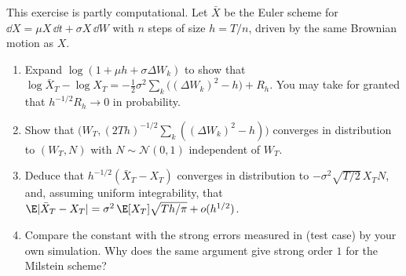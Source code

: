 \begin{exercise}\label{ex:ps-strong-constant}
\hard This exercise is partly computational. Let $\bar X$ be the Euler scheme for
$\dd X=\mu X\,\dd t+\sigma X\,\dd W$ with $n$ steps of size $h=T/n$, driven by the same
Brownian motion as $X$.
\begin{enumerate}[label=(\alph*)]
  \item Expand $\log(1+\mu h+\sigma\Delta W_k)$ to show that
    $\log\bar X_T-\log X_T=-\frac12\sigma^2\sum_{k}\big((\Delta W_k)^2-h\big)+R_h$. You may
    take for granted that $h^{-1/2}R_h\to0$ in probability.
  \item Show that $\big(W_T,(2Th)^{-1/2}\sum_k((\Delta W_k)^2-h)\big)$ converges in distribution
    to $(W_T,N)$ with $N\sim\mathcal N(0,1)$ independent of $W_T$.
  \item Deduce that $h^{-1/2}(\bar X_T-X_T)$ converges in distribution to
    $-\sigma^2\sqrt{T/2}\,X_TN$, and, assuming uniform integrability, that
    $\E|\bar X_T-X_T|=\sigma^2\,\E[X_T]\sqrt{Th/\pi}+o(h^{1/2})$.
  \item Compare the constant with the strong errors measured in  (test
    case) by your own simulation. Why does the same argument give strong order $1$ for the
    Milstein scheme?
\end{enumerate}
\end{exercise}
